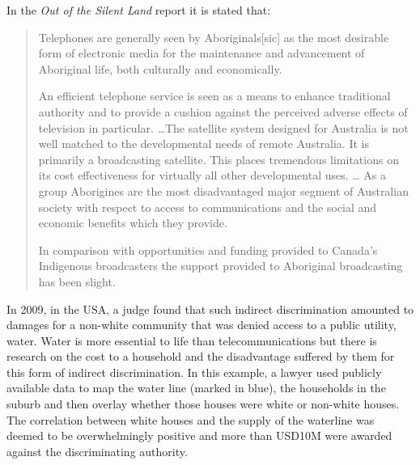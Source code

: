 In the \emph{Out of the Silent Land} report it is stated that:
\begin{quotation}
Telephones are generally seen by Aboriginals[sic] as the most desirable form of electronic media for the maintenance and advancement of Aboriginal life, both culturally and economically. 

An efficient telephone service is seen as a means to enhance traditional authority and to provide a cushion against the perceived adverse effects of television in particular.
\ldots The satellite system designed for Australia is not well matched to the developmental needs of remote Australia. It is primarily a broadcasting satellite. This places tremendous limitations on its cost effectiveness for virtually all other developmental uses.
\ldots
As a group Aborigines are the most disadvantaged major segment of Australian society with respect to access to communications and the social and economic benefits which they provide.

In comparison with opportunities and funding provided to Canada's Indigenous broadcasters the support provided to Aboriginal broadcasting has been slight\cite[p119-123]{RefWorks:79}.
\end{quotation}

In 2009, in the USA, a judge found that such indirect discrimination amounted to damages for a non-white community that was denied access to a public utility, water. Water is more essential to life than telecommunications but there is research on the cost to a household and the disadvantage suffered by them for this form of indirect discrimination. In this example, a lawyer used publicly available data to map the water line (marked in blue), the households in the suburb and then overlay whether those houses were white or non-white houses. The correlation between white houses and the supply of the waterline was deemed to be overwhelmingly positive and more than USD10M were awarded against the discriminating authority\cite{RefWorks:288}.


